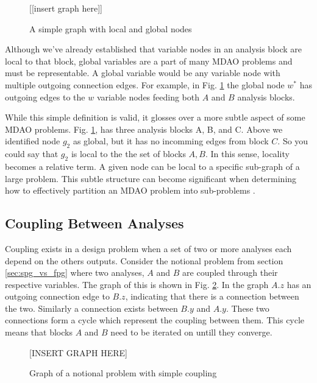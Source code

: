   \begin{figure}
      \begin{center}
      [[insert graph here]]
      \caption{A simple graph with local and global nodes \label{f:local_global}}
      \end{center}
  \end{figure}

  Although we've already established that variable nodes in an analysis block are local to that 
  block, global variables are a part of many MDAO problems and must be representable. A global variable 
  would be any variable node with multiple outgoing connection edges. 
  For example, in Fig. \ref{f:local_global} the global node $w^*$ has outgoing edges to 
  the $w$ variable nodes feeding both $A$ and $B$ analysis blocks.

  While this simple definition is valid, it glosses over a more subtle aspect of 
  some MDAO problems. Fig. \ref{f:local_global}, has three analysis 
  blocks A, B, and C. Above we identified node $g_2$ as global,  but
  it has no incomming edges from block $C$. So you could say that $g_2$ is 
  local to the the set of blocks $A,B$. In this sense, locality 
  becomes a relative term. A given node can be local to a specific sub-graph of a large
  problem. This subtle structure can become significant when determining how to 
  effectively partition an MDAO problem into sub-problems 
  \cite{krishnamachari1997optimal,allison2009optimal,michelena1997hypergraph}.

\subsection{Coupling Between Analyses}

  Coupling exists in a design problem when a set of two or more analyses each depend on the
  others outputs. Consider the notional problem from section \ref{sec:spg_vs_fpg} where two 
  analyses, $A$ and $B$ are coupled through their respective variables. The graph of this 
  is shown in Fig. \ref{f:coupling}. In the graph $A.z$ has an outgoing connection 
  edge to $B.z$, indicating that there is a connection between the two. 
  Similarly a connection exists between $B.y$ and $A.y$. These two connections form 
  a cycle which represent the coupling between them. This cycle means that blocks $A$ and $B$ need
  to be iterated on untill they converge. 

  \begin{figure}
      \begin{center}
      [INSERT GRAPH HERE]
      \caption{Graph of a notional problem with simple coupling \label{f:coupling}}
      \end{center}
  \end{figure}

